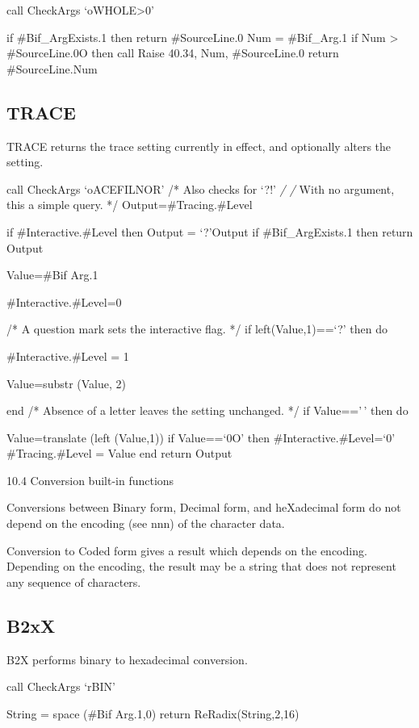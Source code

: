 call CheckArgs `oWHOLE\textgreater0'

if \#Bif\_ArgExists.1 then return \#SourceLine.0 Num = \#Bif\_Arg.1 if
Num \textgreater{} \#SourceLine.0O then call Raise 40.34, Num,
\#SourceLine.0 return \#SourceLine.Num

\hypertarget{trace}{%
\subsection{TRACE}\label{trace}}

TRACE returns the trace setting currently in effect, and optionally
alters the setting.

call CheckArgs `oACEFILNOR' /* Also checks for `?!' \emph{/ /} With no
argument, this a simple query. */ Output=\#Tracing.\#Level

if \#Interactive.\#Level then Output = `?'\textbar\textbar Output if
\#Bif\_ArgExists.1 then return Output

Value=\#Bif Arg.1

\#Interactive.\#Level=0

/* A question mark sets the interactive flag. */ if left(Value,1)==`?'
then do

\#Interactive.\#Level = 1

Value=substr (Value, 2)

end /* Absence of a letter leaves the setting unchanged. */ if
Value=='\,' then do

Value=translate (left (Value,1)) if Value==`0O' then
\#Interactive.\#Level=`0' \#Tracing.\#Level = Value end return Output

10.4 Conversion built-in functions

Conversions between Binary form, Decimal form, and heXadecimal form do
not depend on the encoding (see nnn) of the character data.

Conversion to Coded form gives a result which depends on the encoding.
Depending on the encoding, the result may be a string that does not
represent any sequence of characters.

\hypertarget{b2xx}{%
\subsection{B2xX}\label{b2xx}}

B2X performs binary to hexadecimal conversion.

call CheckArgs `rBIN'

String = space (\#Bif Arg.1,0) return ReRadix(String,2,16)

